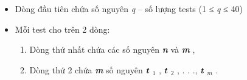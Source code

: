\begin{itemize}
	\item 

Dòng đầu tiên chứa số nguyên \emph{ q } – số lượng tests (1 ≤ \emph{ q } ≤ 40)
	\item Mỗi test cho trên 2 dòng:
\begin{enumerate}
	\item Dòng thứ nhất chứa các số nguyên \textbf{\emph{ n }} và \textbf{\emph{ m }} ,
	\item Dòng thứ 2 chứa \textbf{\emph{ m }} số nguyên \textbf{\emph{ t $_ 1 $}} , \textbf{\emph{ t $_ 2 $}} , . . ., \textbf{\emph{ t $_ m $}} .
\end{enumerate}
\end{itemize}

\